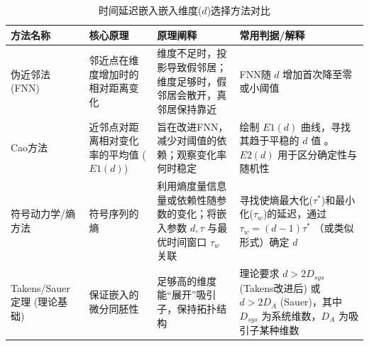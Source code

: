 \begin{table}[h!] %
    \centering %
    \caption{时间延迟嵌入嵌入维度($d$)选择方法对比}
    \label{tab:embedding_dimension_methods_no_pros_cons_new}
    \begin{tabular}{
        >{\raggedright\arraybackslash}m{3cm} %
        >{\raggedright\arraybackslash}m{4.5cm} %
        >{\raggedright\arraybackslash}m{5cm}  %
        >{\raggedright\arraybackslash}m{4cm}  %
        }
        \toprule %
        \textbf{方法名称}                        & \textbf{核心原理}             & \textbf{原理阐释}                                          & \textbf{常用判据/解释}                                                                       \\
        \midrule %

        伪近邻法 (FNN) \cite{rhodes1997false}    & 邻近点在维度增加时的相对距离变化          & 维度不足时，投影导致假邻居；维度足够时，假邻居会散开，真邻居保持靠近                     & FNN随 $d$ 增加首次降至零或小阈值                                                                   \\
        \addlinespace %

        Cao方法\cite{cao1997practical}         & 近邻点对距离相对变化率的平均值 ($E1(d)$) & 旨在改进FNN，减少对阈值的依赖；观察变化率何时稳定                             & 绘制 $E1(d)$ 曲线，寻找其趋于平稳的 $d$ 值 。$E2(d)$ 用于区分确定性与随机性                                      \\
        \addlinespace

        符号动力学/熵方法\cite{matilla2021selection} & 符号序列的熵                    & 利用熵度量信息量或依赖性随参数的变化；将嵌入参数 $d, \tau$ 与最优时间窗口 $\tau_w$ 关联 & 寻找使熵最大化($\tau^*$)和最小化($\tau_w$)的延迟，通过 $\tau_w=(d-1)\tau^*$ （或类似形式）确定 $d$               \\
        \addlinespace

        Takens/Sauer 定理 (理论基础)               & 保证嵌入的微分同胚性                & 足够高的维度能“展开”吸引子，保持拓扑结构                                  & 理论要求 $d > 2D_{sys}$ (Takens改进后) 或 $d > 2D_A$ (Sauer)，其中 $D_{sys}$ 为系统维数，$D_A$ 为吸引子某种维数 \\

        \bottomrule %
    \end{tabular}
    \par %
    \vspace{0.5cm} %
\end{table}

